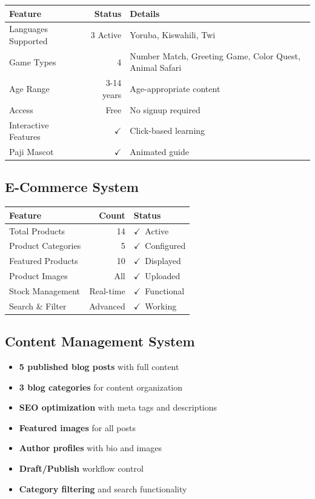 \documentclass[11pt,a4paper]{article}
\newcommand{\mycheck}{\textcolor{ispeak-green}{\textbf{$\checkmark$}}}
\begin{document}
\begin{tabular}{lrl}
\toprule
\textbf{Feature} & \textbf{Status} & \textbf{Details} \\
\midrule
Languages Supported & 3 Active & Yoruba, Kiswahili, Twi \\
Game Types & 4 & Number Match, Greeting Game, Color Quest, Animal Safari \\
Age Range & 3-14 years & Age-appropriate content \\
Access & Free & No signup required \\
Interactive Features & \mycheck & Click-based learning \\
Paji Mascot & \mycheck & Animated guide \\
\bottomrule
\end{tabular}

\subsection{E-Commerce System}

\begin{tabular}{lrl}
\toprule
\textbf{Feature} & \textbf{Count} & \textbf{Status} \\
\midrule
Total Products & 14 & \mycheck\ Active \\
Product Categories & 5 & \mycheck\ Configured \\
Featured Products & 10 & \mycheck\ Displayed \\
Product Images & All & \mycheck\ Uploaded \\
Stock Management & Real-time & \mycheck\ Functional \\
Search \& Filter & Advanced & \mycheck\ Working \\
\bottomrule
\end{tabular}

\subsection{Content Management System}

\begin{itemize}[leftmargin=*, label=\mycheck]
    \item \textbf{5 published blog posts} with full content
    \item \textbf{3 blog categories} for content organization
    \item \textbf{SEO optimization} with meta tags and descriptions
    \item \textbf{Featured images} for all posts
    \item \textbf{Author profiles} with bio and images
    \item \textbf{Draft/Publish} workflow control
    \item \textbf{Category filtering} and search functionality
\end{itemize}
\end{document}
